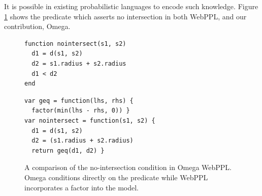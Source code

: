 It is possible in existing probabilistic languages to encode such knowledge.
Figure \ref{fig:compare} shows the predicate which asserts no intersection in both WebPPL, and our contribution, Omega.
\begin{figure}[h]
\centering
\begin{minipage}[c]{5.7cm}
\begin{Verbatim}
function nointersect(s1, s2)
  d1 = d(s1, s2)
  d2 = s1.radius + s2.radius
  d1 < d2
end
\end{Verbatim}
\end{minipage}%
\begin{minipage}[c]{5.7cm}
\begin{Verbatim}
var geq = function(lhs, rhs) {
  factor(min(lhs - rhs, 0)) }
var nointersect = function(s1, s2) {
  d1 = d(s1, s2)
  d2 = (s1.radius + s2.radius)
  return geq(d1, d2) }
\end{Verbatim}
\end{minipage}%
\caption{A comparison of the no-intersection condition in Omega WebPPL. Omega conditions directly on the predicate while WebPPL incorporates a factor into the model.}
\label{fig:compare}
\end{figure}






